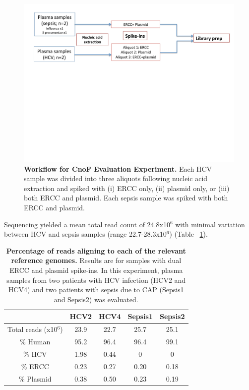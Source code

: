 \begin{figure}[htbp]
\centering
\includegraphics[width=150mm, trim={0 10cm 0 0},clip]{./Results1/Images/Exp2.pdf}
\caption[Combined no fragmentation library preparation evaluation]{\textbf{Workflow for CnoF Evaluation Experiment.} Each HCV sample was divided into three aliquots following nucleic acid extraction and spiked with (i) ERCC only, (ii) plasmid only, or (iii) both ERCC and plasmid. Each sepsis sample was spiked with both ERCC and plasmid.}
\label{fig:Exp2}
\end{figure}
\FloatBarrier

Sequencing yielded a mean total read count of 24.8x10$^6$ with minimal variation between HCV and sepsis samples (range 22.7-28.3x10$^6$) (Table ~\ref{tab:OptSummary}).

\begin{table}[]
\begin{tabular}{|c|c|c|c|c|}
\hline
                      & HCV2 & HCV4 & Sepsis1 & Sepsis2 \\ \hline
Total reads (x10$^6$) & 23.9   & 22.7   & 25.7    & 25.1    \\ \hline
\% Human              & 95.2   & 96.4   & 96.4    & 99.1    \\ \hline
\% HCV                & 1.98   & 0.44   & 0       & 0       \\ \hline
\% ERCC               & 0.23   & 0.27   & 0.20    & 0.18    \\ \hline
\% Plasmid            & 0.38   & 0.50   & 0.23    & 0.19    \\ \hline
\end{tabular}
\caption[Combined no fragmentation evaluation: summary]{\textbf{Percentage of reads aligning to each of the relevant reference genomes.} Results are for samples with dual ERCC and plasmid spike-ins. In this experiment, plasma samples from two patients with HCV infection (HCV2 and HCV4) and two patients with sepsis due to CAP (Sepsis1 and Sepsis2) was evaluated.}
\label{tab:OptSummary}
\end{table}

